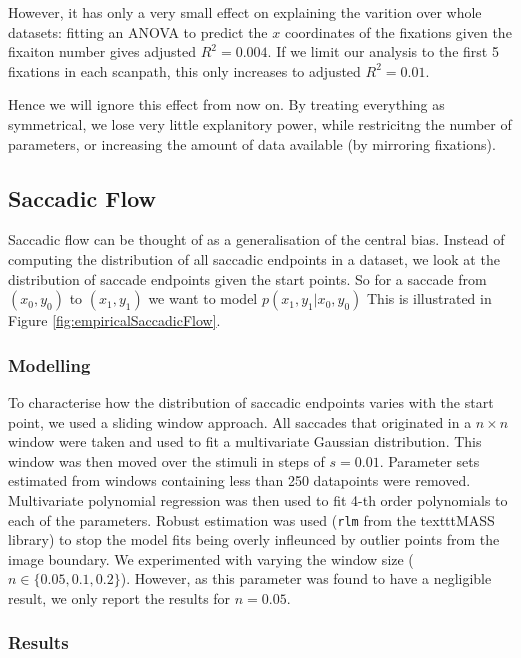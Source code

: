 However, it has only a very small effect on explaining the varition over whole datasets: fitting an ANOVA to predict the $x$ coordinates of the fixations given the fixaiton number gives adjusted $R^2=0.004$. If we limit our analysis to the first 5 fixations in each scanpath, this only increases to adjusted $R^2=0.01$. 

Hence we will ignore this effect from now on. By treating everything as symmetrical, we lose very little explanitory power, while restricitng the number of parameters, or increasing the amount of data available (by mirroring fixations). 

\subsection{Saccadic Flow}
\label{ModellingFlow}

Saccadic flow can be thought of as a generalisation of the central bias. Instead of computing the distribution of all saccadic endpoints in a dataset, we look at the distribution of saccade endpoints given the start points. So for a saccade from $(x_0, y_0)$ to $(x_1, y_1)$ we want to model $p(x_1,y_1|x_0, y_0)$ This is illustrated in Figure \ref{fig:empiricalSaccadicFlow}.

\subsubsection{Modelling}


To characterise how the distribution of saccadic endpoints varies with the start point, we used a sliding window approach. All saccades that originated in a $n\times n$ window were taken and used to fit a multivariate Gaussian distribution. This window was then moved over the stimuli in steps of $s=0.01$. Parameter sets estimated from windows containing less than 250 datapoints were removed. Multivariate polynomial regression was then used to fit 4-th order polynomials to each of the parameters. Robust estimation was used (\texttt{rlm} from the texttt{MASS} library) to stop the model fits being overly infleunced by outlier points from the image boundary. We experimented with varying the window size ($n\in\{0.05,0.1, 0.2\}$). However, as this parameter was found to have a negligible result, we only report the results for $n=0.05$.

\subsubsection{Results}

